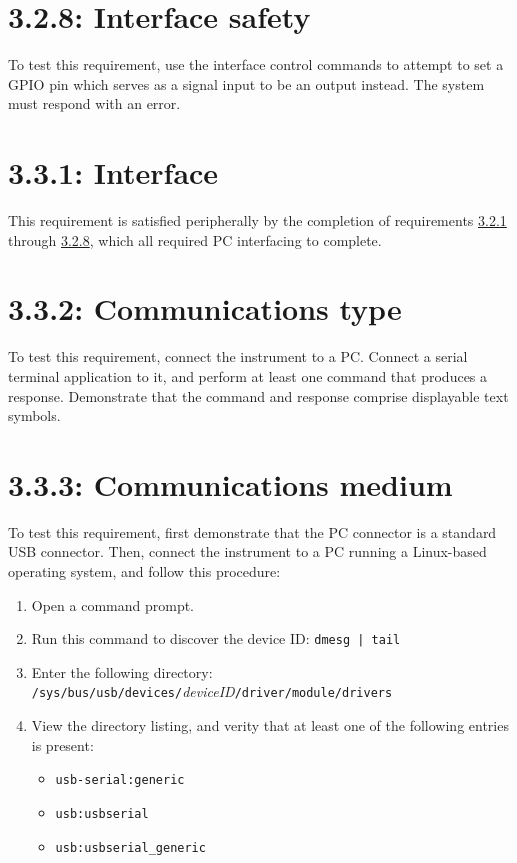 \section*{3.2.8: Interface safety}
\label{tp:3.2.8}
To test this requirement, use the interface control commands to attempt to set a GPIO pin
which serves as a signal input to be an output instead. The system must respond with an error.

\section*{3.3.1: Interface}
This requirement is satisfied peripherally by the completion of requirements \hyperref[tp:3.2.1]{3.2.1}
through \hyperref[tp:3.2.8]{3.2.8}, which all required PC interfacing to complete.

\section*{3.3.2: Communications type}
To test this requirement, connect the instrument to a PC. Connect a serial terminal application
to it, and perform at least one command that produces a response. Demonstrate that the
command and response comprise displayable text symbols.

\section*{3.3.3: Communications medium}
To test this requirement, first demonstrate that the PC connector is a standard
USB connector. Then, connect the instrument to a PC running a Linux-based
operating system, and follow this procedure:

\begin{enumerate}
\item{Open a command prompt.}
\item{Run this command to discover the device ID: \texttt{dmesg | tail}}
\item{Enter the following directory: \texttt{/sys/bus/usb/devices/}\emph{deviceID}\texttt{/driver/module/drivers}}
\item{View the directory listing, and verity that at least one of the following entries is present:
    \begin{itemize}
    \item{\texttt{usb-serial:generic}}
    \item{\texttt{usb:usbserial}}
    \item{\texttt{usb:usbserial\_generic}}
    \end{itemize}
}
\end{enumerate}

